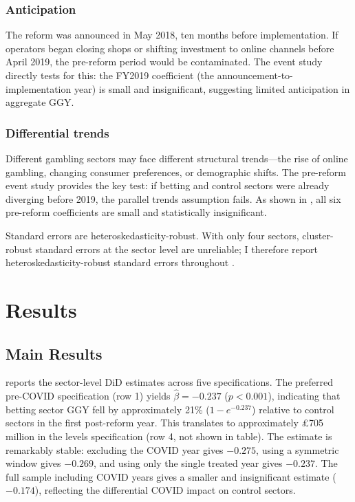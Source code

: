 \documentclass[12pt]{article}
\begin{document}
\subsubsection*{Anticipation} The reform was announced in May 2018, ten months before implementation. If operators began closing shops or shifting investment to online channels before April 2019, the pre-reform period would be contaminated. The event study directly tests for this: the FY2019 coefficient (the announcement-to-implementation year) is small and insignificant, suggesting limited anticipation in aggregate GGY.

\subsubsection*{Differential trends} Different gambling sectors may face different structural trends---the rise of online gambling, changing consumer preferences, or demographic shifts. The pre-reform event study provides the key test: if betting and control sectors were already diverging before 2019, the parallel trends assumption fails. As shown in , all six pre-reform coefficients are small and statistically insignificant.

Standard errors are heteroskedasticity-robust. With only four sectors, cluster-robust standard errors at the sector level are unreliable; I therefore report heteroskedasticity-robust standard errors throughout \citep{roth2023pretrend}.

\section{Results}

\subsection{Main Results}



 reports the sector-level DiD estimates across five specifications. The preferred pre-COVID specification (row 1) yields $\hat{\beta} = -0.237$ ($p < 0.001$), indicating that betting sector GGY fell by approximately 21\% ($1 - e^{-0.237}$) relative to control sectors in the first post-reform year. This translates to approximately \pounds 705 million in the levels specification (row 4, not shown in table). The estimate is remarkably stable: excluding the COVID year gives $-0.275$, using a symmetric window gives $-0.269$, and using only the single treated year gives $-0.237$. The full sample including COVID years gives a smaller and insignificant estimate ($-0.174$), reflecting the differential COVID impact on control sectors.
\end{document}
